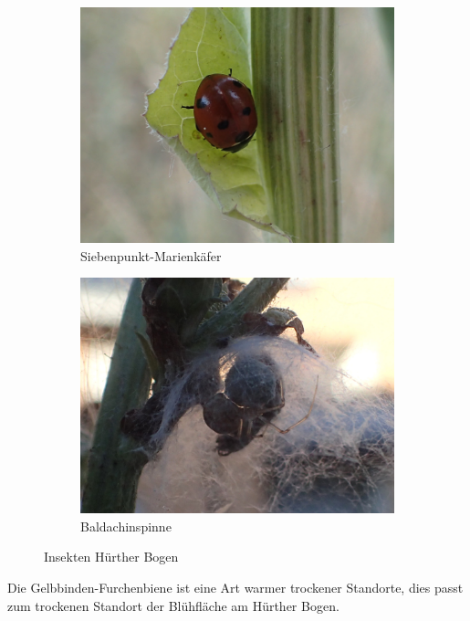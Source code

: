 \documentclass[10pt]{article}
\begin{document}
\begin{figure}[h!]
\begin{subfigure}[b]{0.44\linewidth}
    \includegraphics[width=\linewidth]{img/bogen/siebenpunkt.jpg}
    \caption{Siebenpunkt-Marienkäfer}
  \end{subfigure}
  \begin{subfigure}[b]{0.44\linewidth}
    \includegraphics[width=\linewidth]{img/bogen/trapezspinne.jpg}
    \caption{Baldachinspinne}
  \end{subfigure}
  \caption{Insekten Hürther Bogen}
\end{figure}

Die Gelbbinden-Furchenbiene ist eine Art warmer trockener Standorte, dies passt zum trockenen Standort der Blühfläche am Hürther Bogen.

\clearpage
\end{document}
